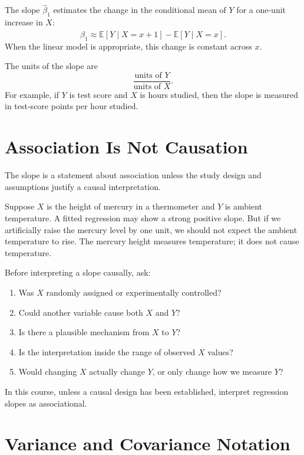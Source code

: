 The slope $\widehat{\beta}_1$ estimates the change in the conditional mean of $Y$ for a one-unit increase in $X$:
\begin{equation}
  \widehat{\beta}_1 \approx \mathbb{E}[Y\mid X=x+1]-\mathbb{E}[Y\mid X=x].
\end{equation}
When the linear model is appropriate, this change is constant across $x$.

The units of the slope are
\begin{equation}
  \frac{\text{units of }Y}{\text{units of }X}.
\end{equation}
For example, if $Y$ is test score and $X$ is hours studied, then the slope is measured in test-score points per hour studied.

\section{Association Is Not Causation}

The slope is a statement about association unless the study design and assumptions justify a causal interpretation.

Suppose $X$ is the height of mercury in a thermometer and $Y$ is ambient temperature.  A fitted regression may show a strong positive slope.  But if we artificially raise the mercury level by one unit, we should not expect the ambient temperature to rise.  The mercury height measures temperature; it does not cause temperature.

Before interpreting a slope causally, ask:
\begin{enumerate}
  \item Was $X$ randomly assigned or experimentally controlled?
  \item Could another variable cause both $X$ and $Y$?
  \item Is there a plausible mechanism from $X$ to $Y$?
  \item Is the interpretation inside the range of observed $X$ values?
  \item Would changing $X$ actually change $Y$, or only change how we measure $Y$?
\end{enumerate}

In this course, unless a causal design has been established, interpret regression slopes as associational.

\section{Variance and Covariance Notation}

